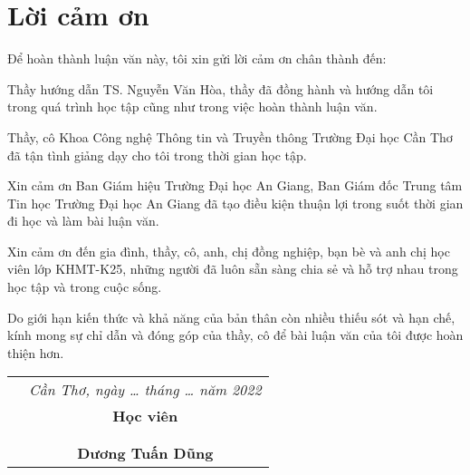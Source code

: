 \chapter*{Lời cảm ơn}
Để hoàn thành luận văn này, tôi xin gửi lời cảm ơn chân thành đến:

Thầy hướng dẫn TS. Nguyễn Văn Hòa, thầy đã đồng hành và hướng dẫn tôi trong quá trình học tập cũng như trong việc hoàn thành luận văn.

Thầy, cô Khoa Công nghệ Thông tin và Truyền thông Trường Đại học Cần Thơ đã tận tình giảng dạy cho tôi trong thời gian học tập.

Xin cảm ơn Ban Giám hiệu Trường Đại học An Giang, Ban Giám đốc Trung tâm Tin học Trường Đại học An Giang đã tạo điều kiện thuận lợi trong suốt thời gian đi học và làm bài luận văn.

Xin cảm ơn đến gia đình, thầy, cô, anh, chị đồng nghiệp, bạn bè và anh chị học viên lớp KHMT-K25, những người đã luôn sẵn sàng chia sẻ và hỗ trợ nhau trong học tập và trong cuộc sống.

Do giới hạn kiến thức và khả năng của bản thân còn nhiều thiếu sót và hạn chế, kính mong sự chỉ dẫn và đóng góp của thầy, cô để bài luận văn của tôi được hoàn thiện hơn.
\begin{center}
\begin{longtable}{cc}

\hspace{40mm} & \textit{Cần Thơ, ngày \ldots{} tháng \ldots{}  năm 2022 } \\ 
 & \textbf{Học viên} \\ 
\\
\\

 & \textbf{Dương Tuấn Dũng}  \\ 

\end{longtable}
\end{center}